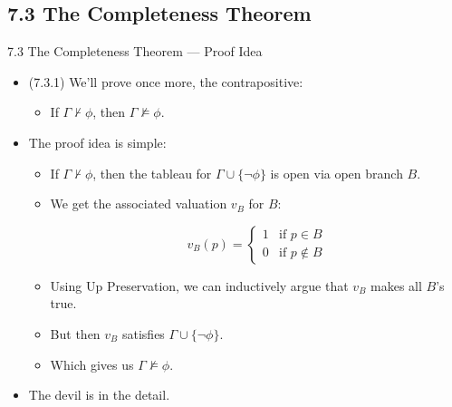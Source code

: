 \documentclass[../slides.tex]{subfiles}
\begin{document}
\subsection{7.3 The Completeness Theorem}

\begin{frame}{7.3 The Completeness Theorem --- Proof Idea}


	\begin{itemize}
	
		\item (7.3.1) We'll prove once more, the contrapositive:
		
		\begin{itemize}
		
			\item If $\Gamma\nvdash\phi$, then $\Gamma\nvDash\phi$.
		
		\end{itemize}
		
		\item The proof idea is simple:
		
			\begin{itemize}
			
				\item If $\Gamma\nvdash\phi$, then the tableau for $\Gamma\cup\{\neg\phi\}$ is open via open branch $B$.
				
				\item We get the associated valuation $v_B$ for $B$:
				
				\[v_B(p)=\begin{cases} 1 &\text{if }p\in B\\0&\text{if }p\notin B\end{cases}\]
 
				
				\item Using Up Preservation, we can inductively argue that $v_B$ makes all $B$'s true.
				
				\item But then $v_B$ satisfies  $\Gamma\cup\{\neg\phi\}$.
				
				\item Which gives us $\Gamma\nvDash\phi$. 
			
			\end{itemize}
	
		\item The devil is in the detail.
	
	\end{itemize}	

\end{frame}
\end{document}

